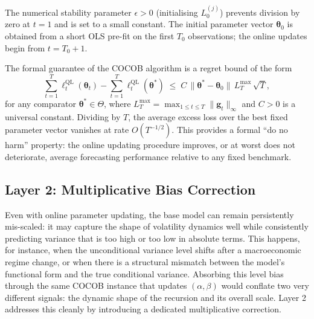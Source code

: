 The numerical stability parameter $\epsilon > 0$ (initialising $L_0^{(j)}$) prevents division by zero at $t = 1$ and is set to a small constant. The initial parameter vector $\boldsymbol{\theta}_0$ is obtained from a short OLS pre-fit on the first $T_0$ observations; the online updates begin from $t = T_0 + 1$.

The formal guarantee of the COCOB algorithm is a regret bound of the form \citep{orabona2017training}
\begin{equation}\label{eq:cocob_regret}
    \sum_{t=1}^{T} \ell_t^{\mathrm{QL}}(\boldsymbol{\theta}_t) - \sum_{t=1}^{T} \ell_t^{\mathrm{QL}}(\boldsymbol{\theta}^*) \;\leq\; C \, \|\boldsymbol{\theta}^* - \boldsymbol{\theta}_0\| \, L_T^{\max} \, \sqrt{T},
\end{equation}
for any comparator $\boldsymbol{\theta}^* \in \Theta$, where $L_T^{\max} = \max_{1 \leq t \leq T} \|\mathbf{g}_t\|_\infty$ and $C > 0$ is a universal constant. Dividing by $T$, the average excess loss over the best fixed parameter vector vanishes at rate $O(T^{-1/2})$. This provides a formal ``do no harm'' property: the online updating procedure improves, or at worst does not deteriorate, average forecasting performance relative to any fixed benchmark.

\subsection{Layer 2: Multiplicative Bias Correction}\label{sec:layer2}

Even with online parameter updating, the base model can remain persistently mis-scaled: it may capture the shape of volatility dynamics well while consistently predicting variance that is too high or too low in absolute terms. This happens, for instance, when the unconditional variance level shifts after a macroeconomic regime change, or when there is a structural mismatch between the model's functional form and the true conditional variance. Absorbing this level bias through the same COCOB instance that updates $(\alpha, \beta)$ would conflate two very different signals: the dynamic shape of the recursion and its overall scale. Layer 2 addresses this cleanly by introducing a dedicated multiplicative correction.

